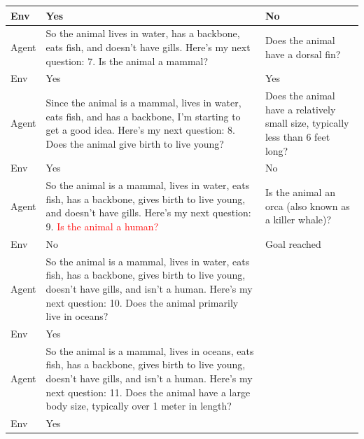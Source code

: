 \begin{table}[h]
{\begin{tabular}{|p{1cm} | p{7cm} | p{7cm}|}
        \hline
        Env & Yes & No \\
        \hline
        Agent & So the animal lives in water, has a backbone, eats fish, and doesn't have gills. Here's my next question: 7. Is the animal a mammal? & Does the animal have a dorsal fin? \\
        \hline
        Env & Yes & Yes \\
        \hline
        Agent & Since the animal is a mammal, lives in water, eats fish, and has a backbone, I'm starting to get a good idea. Here's my next question: 8. Does the animal give birth to live young? & Does the animal have a relatively small size, typically less than 6 feet long? \\
        \hline
        Env & Yes & No \\
        \hline
        Agent & So the animal is a mammal, lives in water, eats fish, has a backbone, gives birth to live young, and doesn't have gills. Here's my next question: 9. \textcolor{red}{Is the animal a human?} & Is the animal an orca (also known as a killer whale)? \\
        \hline
        Env & No & Goal reached \\
        \hline
        Agent & So the animal is a mammal, lives in water, eats fish, has a backbone, gives birth to live young, doesn't have gills, and isn't a human. Here's my next question: 10. Does the animal primarily live in oceans? &  \\
        \hline
        Env & Yes &  \\
        \hline
        Agent & So the animal is a mammal, lives in oceans, eats fish, has a backbone, gives birth to live young, doesn't have gills, and isn't a human. Here's my next question: 11. Does the animal have a large body size, typically over 1 meter in length? & \\
        \hline
        Env & Yes & \\
        \bottomrule
        \end{tabular}
    }
    \vspace{-0.3cm}
\end{table}

\newpage

